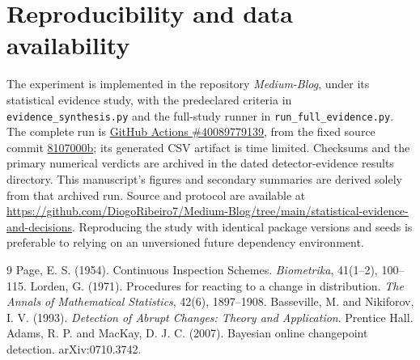 \documentclass[11pt,a4paper]{article}
\begin{document}
\section*{Reproducibility and data availability}
The experiment is implemented in the repository \emph{Medium-Blog}, under its statistical evidence study, with the predeclared criteria in \texttt{evidence\_synthesis.py} and the full-study runner in \texttt{run\_full\_evidence.py}. The complete run is \href{https://github.com/DiogoRibeiro7/Medium-Blog/actions/runs/40089779139}{GitHub Actions \#40089779139}, from the fixed source commit \href{https://github.com/DiogoRibeiro7/Medium-Blog/commit/8107000be634ba6a02f6e2dbd219e9a932082638}{8107000b}; its generated CSV artifact is time limited. Checksums and the primary numerical verdicts are archived in the dated detector-evidence results directory. This manuscript's figures and secondary summaries are derived solely from that archived run. Source and protocol are available at \url{https://github.com/DiogoRibeiro7/Medium-Blog/tree/main/statistical-evidence-and-decisions}. Reproducing the study with identical package versions and seeds is preferable to relying on an unversioned future dependency environment.

\begin{thebibliography}{9}
 Page, E. S. (1954). Continuous Inspection Schemes. \emph{Biometrika}, 41(1--2), 100--115.
 Lorden, G. (1971). Procedures for reacting to a change in distribution. \emph{The Annals of Mathematical Statistics}, 42(6), 1897--1908.
 Basseville, M. and Nikiforov, I. V. (1993). \emph{Detection of Abrupt Changes: Theory and Application}. Prentice Hall.
 Adams, R. P. and MacKay, D. J. C. (2007). Bayesian online changepoint detection. arXiv:0710.3742.
\end{thebibliography}
\end{document}
